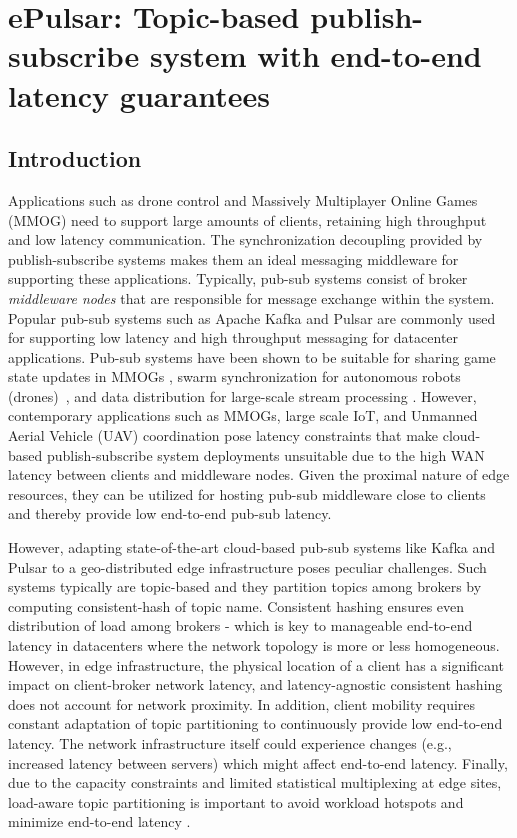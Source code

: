 \chapter{ePulsar: Topic-based publish-subscribe system with end-to-end latency guarantees}
\label{sec:epulsar}

\section{Introduction}
Applications such as drone control and Massively Multiplayer Online Games (MMOG) need to support large amounts of clients, retaining high throughput and low latency communication. The synchronization decoupling provided by publish-subscribe systems \cite{manyfaces, PubSubForMultiplayerGames} makes them an ideal messaging middleware for supporting these applications. Typically, pub-sub systems consist of broker \textit{middleware nodes} that are responsible for message exchange  within the system. Popular pub-sub systems such as Apache Kafka and Pulsar are commonly used for supporting low latency and high throughput messaging for datacenter applications. %
Pub-sub systems have been shown to be suitable for sharing game state updates in MMOGs  \cite{PubSubForMultiplayerGames}, swarm synchronization for autonomous robots (drones)~\cite{flynetsim}, and data distribution for large-scale stream processing \cite{7164934}. However, contemporary applications such as MMOGs, large scale IoT, and Unmanned Aerial Vehicle (UAV) coordination pose latency constraints that make cloud-based publish-subscribe system deployments unsuitable due to the high WAN latency between clients and middleware nodes. Given the proximal nature of edge resources, they can be utilized for hosting pub-sub middleware close to clients and thereby provide low end-to-end pub-sub latency.
\par However, adapting state-of-the-art cloud-based pub-sub systems like Kafka and Pulsar to a geo-distributed edge infrastructure poses peculiar challenges. Such systems typically are topic-based and they partition topics among brokers by computing consistent-hash of topic name. Consistent hashing ensures even distribution of load among brokers - which is key to manageable end-to-end latency in datacenters where the network topology is more or less homogeneous. However, in edge infrastructure, the physical location of a client has a significant impact on client-broker network latency, and latency-agnostic consistent hashing does not account for network proximity. In addition, client mobility requires constant adaptation of topic partitioning to continuously provide low end-to-end latency. The network infrastructure itself could experience changes (e.g., increased latency between servers) which might affect end-to-end latency. Finally, due to the capacity constraints and limited statistical multiplexing at edge sites, load-aware topic partitioning is %
important to avoid workload hotspots and minimize end-to-end latency \cite{khare2018scalable}.

